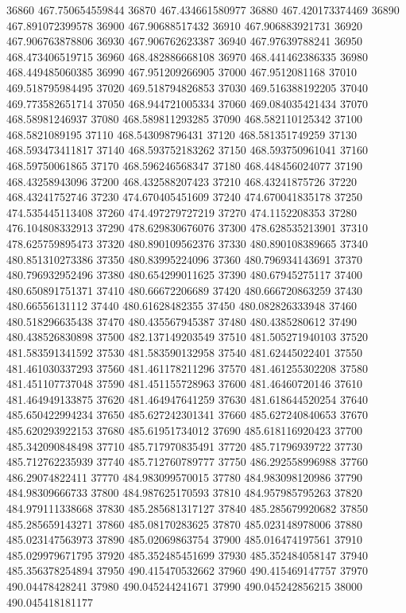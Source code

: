 {36860 467.750654559844
36870 467.434661580977
36880 467.420173374469
36890 467.891072399578
36900 467.90688517432
36910 467.906883921731
36920 467.906763878806
36930 467.906762623387
36940 467.97639788241
36950 468.473406519715
36960 468.482886668108
36970 468.441462386335
36980 468.449485060385
36990 467.951209266905
37000 467.9512081168
37010 469.518795984495
37020 469.518794826853
37030 469.516388192205
37040 469.773582651714
37050 468.944721005334
37060 469.084035421434
37070 468.58981246937
37080 468.589811293285
37090 468.582110125342
37100 468.5821089195
37110 468.543098796431
37120 468.581351749259
37130 468.593473411817
37140 468.593752183262
37150 468.593750961041
37160 468.59750061865
37170 468.596246568347
37180 468.448456024077
37190 468.43258943096
37200 468.432588207423
37210 468.43241875726
37220 468.43241752746
37230 474.670405451609
37240 474.670041835178
37250 474.535445113408
37260 474.497279727219
37270 474.1152208353
37280 476.104808332913
37290 478.629830676076
37300 478.628535213901
37310 478.625759895473
37320 480.890109562376
37330 480.890108389665
37340 480.851310273386
37350 480.83995224096
37360 480.796934143691
37370 480.796932952496
37380 480.654299011625
37390 480.67945275117
37400 480.650891751371
37410 480.66672206689
37420 480.666720863259
37430 480.66556131112
37440 480.61628482355
37450 480.082826333948
37460 480.518296635438
37470 480.435567945387
37480 480.4385280612
37490 480.438526830898
37500 482.137149203549
37510 481.505271940103
37520 481.583591341592
37530 481.583590132958
37540 481.62445022401
37550 481.461030337293
37560 481.461178211296
37570 481.461255302208
37580 481.451107737048
37590 481.451155728963
37600 481.46460720146
37610 481.464949133875
37620 481.464947641259
37630 481.618644520254
37640 485.650422994234
37650 485.627242301341
37660 485.627240840653
37670 485.620293922153
37680 485.61951734012
37690 485.618116920423
37700 485.342090848498
37710 485.717970835491
37720 485.71796939722
37730 485.712762235939
37740 485.712760789777
37750 486.292558996988
37760 486.29074822411
37770 484.983099570015
37780 484.983098120986
37790 484.98309666733
37800 484.987625170593
37810 484.957985795263
37820 484.979111338668
37830 485.285681317127
37840 485.285679920682
37850 485.285659143271
37860 485.08170283625
37870 485.023148978006
37880 485.023147563973
37890 485.02069863754
37900 485.016474197561
37910 485.029979671795
37920 485.352485451699
37930 485.352484058147
37940 485.356378254894
37950 490.415470532662
37960 490.415469147757
37970 490.04478428241
37980 490.045244241671
37990 490.045242856215
38000 490.045418181177
}
